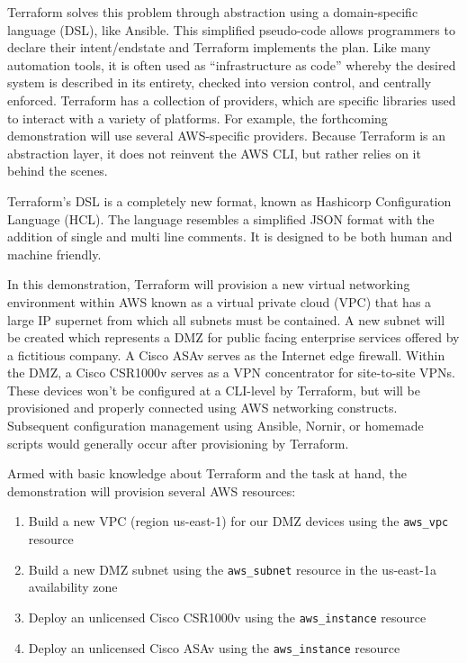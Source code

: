 Terraform solves this problem through abstraction using a domain-specific
language (DSL), like Ansible. This simplified pseudo-code allows programmers
to declare their intent/endstate and Terraform implements the plan. Like many
automation tools, it is often used as ``infrastructure as code'' whereby the
desired system is described in its entirety, checked into version control, and
centrally enforced. Terraform has a collection of providers, which are
specific libraries used to interact with a variety of platforms. For example,
the forthcoming demonstration will use several AWS-specific providers. Because
Terraform is an abstraction layer, it does not reinvent the AWS CLI, but
rather relies on it behind the scenes.

Terraform's DSL is a completely new format, known as Hashicorp Configuration
Language (HCL). The language resembles a simplified JSON format with the
addition of single and multi line comments. It is designed to be both human
and machine friendly.

In this demonstration, Terraform will provision a new virtual networking
environment within AWS known as a virtual private cloud (VPC) that has a large
IP supernet from which all subnets must be contained. A new subnet will be
created which represents a DMZ for public facing enterprise services offered
by a fictitious company. A Cisco ASAv serves as the Internet edge firewall.
Within the DMZ, a Cisco CSR1000v serves as a VPN concentrator for site-to-site
VPNs. These devices won't be configured at a CLI-level by Terraform, but will
be provisioned and properly connected using AWS networking constructs.
Subsequent configuration management using Ansible, Nornir, or homemade scripts
would generally occur after provisioning by Terraform.

Armed with basic knowledge about Terraform and the task at hand, the
demonstration will provision several AWS resources:

\begin{enumerate}
  \item	Build a new VPC (region us-east-1) for our DMZ devices using the
  \verb|aws_vpc| resource
  \item	Build a new DMZ subnet using the \verb|aws_subnet| resource in the
  us-east-1a availability zone
  \item	Deploy an unlicensed Cisco CSR1000v using the \verb|aws_instance| resource
  \item	Deploy an unlicensed Cisco ASAv using the \verb|aws_instance| resource
\end{enumerate}

